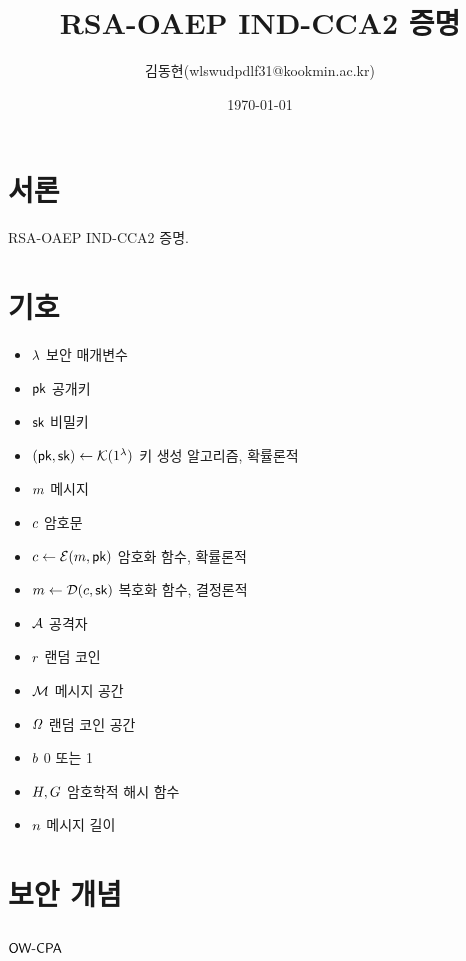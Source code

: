 \documentclass{article}
\title{RSA-OAEP IND-CCA2 증명}
\author{김동현(wlswudpdlf31@kookmin.ac.kr)}
\date{\today}
\begin{document}
\maketitle

\section{서론}
RSA-OAEP IND-CCA2 증명.

\section{기호}

\begin{itemize}
	\item $\sp$ 보안 매개변수
	\item $\pk$ 공개키
	\item $\sk$ 비밀키
	\item $(\pk, \sk) \gets \genkey(1^{\sp})$ 키 생성 알고리즘, 확률론적
	\item $\msg$ 메시지
	\item $\ct$ 암호문
	\item $\ct \gets \enc(\msg, \pk)$ 암호화 함수, 확률론적
	\item $\msg \gets \dec(\ct, \sk)$ 복호화 함수, 결정론적
	\item $\adv$ 공격자
	\item $\coin$ 랜덤 코인
	\item $\msgspace$ 메시지 공간
	\item $\coinspace$ 랜덤 코인 공간
	\item $\bit$ 0 또는 1
	\item $\hash, \gash$ 암호학적 해시 함수
	\item $\mlen$ 메시지 길이
\end{itemize}

\newpage
\section{보안 개념}

\subsection{$\owcpa$}
\end{document}
